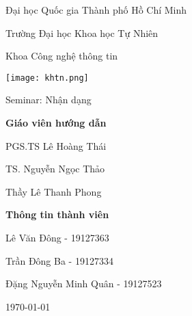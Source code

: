 
\begin{titlepage}
    \begin{center}
        \Large
        Đại học Quốc gia Thành phố Hồ Chí Minh

        \Large
        Trường Đại học Khoa học Tự Nhiên

        \Large
        Khoa Công nghệ thông tin

        \vspace*{1cm}

        \texttt{[image: khtn.png]}
        
        \Huge
        Seminar: Nhận dạng %
        \vspace*{0.5cm}

        \large
        \textbf{Giáo viên hướng dẫn}

        PGS.TS Lê Hoàng Thái

        TS. Nguyễn Ngọc Thảo

        Thầy Lê Thanh Phong
        
        \vspace*{0.3cm}
        \textbf{Thông tin thành viên}

        \large
        Lê Văn Đông - 19127363

        Trần Đông Ba - 19127334

        Đặng Nguyễn Minh Quân - 19127523

        \vfill

        \today

    \end{center}
\end{titlepage}